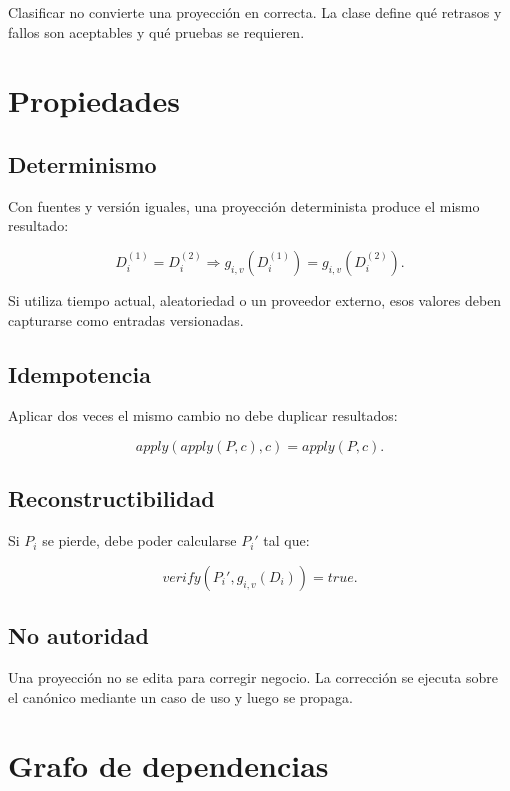 Clasificar no convierte una proyección en correcta. La clase define qué retrasos y
fallos son aceptables y qué pruebas se requieren.

\section{Propiedades}

\subsection{Determinismo}

Con fuentes y versión iguales, una proyección determinista produce el mismo resultado:

\begin{equation}
D_i^{(1)}=D_i^{(2)}\Rightarrow g_{i,v}(D_i^{(1)})=g_{i,v}(D_i^{(2)}).
\end{equation}

Si utiliza tiempo actual, aleatoriedad o un proveedor externo, esos valores deben
capturarse como entradas versionadas.

\subsection{Idempotencia}

Aplicar dos veces el mismo cambio no debe duplicar resultados:

\begin{equation}
apply(apply(P,c),c)=apply(P,c).
\end{equation}

\subsection{Reconstructibilidad}

Si $P_i$ se pierde, debe poder calcularse $P_i'$ tal que:

\begin{equation}
verify(P_i',g_{i,v}(D_i))=true.
\end{equation}

\subsection{No autoridad}

Una proyección no se edita para corregir negocio. La corrección se ejecuta sobre el
canónico mediante un caso de uso y luego se propaga.

\section{Grafo de dependencias}

